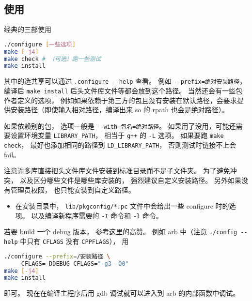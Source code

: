 
\begin{issues}
\issueDraft
\end{issues}


\subsection{使用}
经典的三部使用
\begin{lstlisting}[language=bash]
./configure [一些选项]
make [-j4]
make check # （可选）跑一些测试
make install
\end{lstlisting}
其中的选共享可以通过 \verb|.configure --help| 查看。 例如 \verb|--prefix=绝对安装路径|， 编译后 \verb|make install| 后头文件库文件等都会放到这个路径。 当然还会有一些包作者定义的选项， 例如如果依赖于第三方的包且没有安装在默认路径，会要求提供安装路径（即使输入相对路径，编译出来 so 的 rpath 也会是绝对路径）。

如果依赖别的包， 选项一般是 \verb|--with-包名=绝对路径|。 如果用了没用，可能还需要设置环境变量 \verb|LIBRARY_PATH|， 相当于 \verb|g++| 的 \verb|-L| 选项。 如果要跑 \verb|make check|， 最好也添加相同的路径到 \verb|LD_LIBRARY_PATH|， 否则测试时链接不上会 fail。

注意许多库直接把头文件库文件安装到标准目录而不是子文件夹。 为了避免冲突， 以及区分哪些文件是哪些库安装的， 强烈建议自定义安装路径。 另外如果没有管理员权限， 也只能安装到自定义路径。

\begin{itemize}
\item 在安装目录中， \verb|lib/pkgconfig/*.pc| 文件中会给出一些 configure 时的选项。 以及编译新程序需要的 \verb|-I| 命令和 \verb|-l| 命令。
\end{itemize}

若要 build 一个 debug 版本， 参考\href{https://stackoverflow.com/questions/4553735/gnu-autotools-debug-release-targets}{这里}的高赞。 例如 arb 中（注意 \verb|./config --help| 中只有 \verb|CFLAGS| 没有 \verb|CPPFLAGS|）， 用
\begin{lstlisting}[language=bash]
./configure --prefix=/安装路径 \
     CFLAGS=-DDEBUG CFLAGS="-g3 -O0"
make [-j4]
make install
\end{lstlisting}
即可。 现在在编译主程序后用 gdb 调试就可以进入到 arb 的内部函数中调试。

